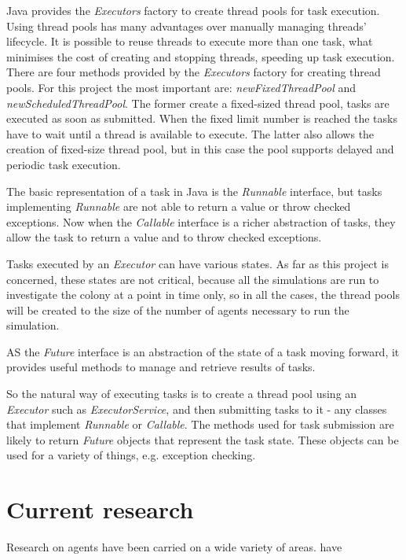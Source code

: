 Java provides the \emph{Executors} factory to create thread pools for task execution. Using thread pools has many advantages over manually managing threads' lifecycle. It is possible to reuse threads to execute more than one task, what minimises the cost of creating and stopping threads, speeding up task execution. There are four methods provided by the \emph{Executors} factory for creating thread pools. For this project the most important are: \emph{newFixedThreadPool} and \emph{newScheduledThreadPool}. The former create a fixed-sized thread pool, tasks are executed as soon as submitted. When the fixed limit number is reached the tasks have to wait until a thread is available to execute. The latter also allows the creation of fixed-size thread pool, but in this case the pool supports delayed and periodic task execution.

The basic representation of a task in Java is the \emph{Runnable} interface, but tasks implementing \emph{Runnable} are not able to return a value or throw checked exceptions.\cite{goetz2006java} Now when the \emph{Callable} interface is a richer abstraction of tasks, they allow the task to return a value and to throw checked exceptions. 

Tasks executed by an \emph{Executor} can have various states. As far as this project is concerned, these states are not critical, because all the simulations are run to investigate the colony at a point in time only, so in all the cases, the thread pools will be created to the size of the number of agents necessary to run the simulation.

AS the \emph{Future} interface is an abstraction of the state of a task moving forward, it provides useful methods to manage and retrieve results of tasks.

So the natural way of executing tasks is to create a thread pool using an \emph{Executor} such as \emph{ExecutorService}, and then submitting tasks to it - any classes that implement \emph{Runnable} or \emph{Callable}. The methods used for task submission are likely to return \emph{Future} objects that represent the task state. These objects can be used for a variety of things, e.g. exception checking.

\section{Current research}

Research on agents have been carried on a wide variety of areas.  \citeauthor{994150} \citealt{994150} have 